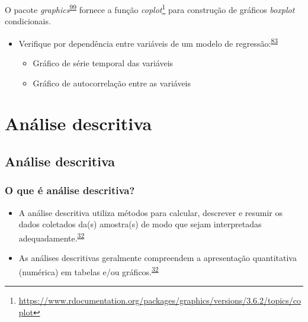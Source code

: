 \documentclass[
  a4paper,
]{book}
\renewcommand{\href}[2]{#2\footnote{\url{#1}}}
\newenvironment{infobox}[1]
  {
  \begin{itemize}
  \renewcommand{\labelitemi}{
    \raisebox{-.7\height}[0pt][0pt]{
      {\setkeys{Gin}{width=3em,keepaspectratio}
        \texttt{[image: \#1]}}
    }
  }
  \setlength{\fboxsep}{1em}
  \begin{blackbox}
  \item
  }
  {
  \end{blackbox}
  \end{itemize}
  }
\begin{document}
\begin{infobox}{images/Rlogo}
O pacote \emph{graphics}\textsuperscript{\protect\hyperlink{ref-graphics}{99}} fornece a função \href{https://www.rdocumentation.org/packages/graphics/versions/3.6.2/topics/coplot}{\emph{coplot}} para construção de gráficos \emph{boxplot} condicionais.

\end{infobox}

\begin{itemize}
\item
  Verifique por dependência entre variáveis de um modelo de regressão:\textsuperscript{\protect\hyperlink{ref-zuur2009}{83}}

  \begin{itemize}
  \item
    Gráfico de série temporal das variáveis
  \item
    Gráfico de autocorrelação entre as variáveis
  \end{itemize}
\end{itemize}

\hypertarget{analise-descritiva}{%
\chapter{\texorpdfstring{\textbf{Análise descritiva}}{Análise descritiva}}\label{analise-descritiva}}

\hypertarget{descritiva}{%
\section{Análise descritiva}\label{descritiva}}

\hypertarget{o-que-uxe9-anuxe1lise-descritiva}{%
\subsection{O que é análise descritiva?}\label{o-que-uxe9-anuxe1lise-descritiva}}

\begin{itemize}
\item
  A análise descritiva utiliza métodos para calcular, descrever e resumir os dados coletados da(s) amostra(s) de modo que sejam interpretadas adequadamente.\textsuperscript{\protect\hyperlink{ref-vetter2017}{32}}
\item
  As análises descritivas geralmente compreendem a apresentação quantitativa (numérica) em tabelas e/ou gráficos.\textsuperscript{\protect\hyperlink{ref-vetter2017}{32}}
\end{itemize}
\end{document}
